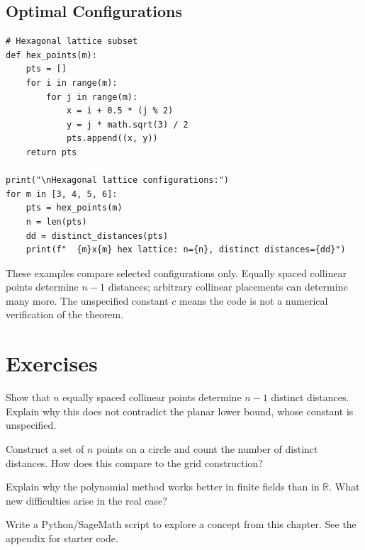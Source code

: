 \subsection{Optimal Configurations}

\begin{verbatim}
# Hexagonal lattice subset
def hex_points(m):
    pts = []
    for i in range(m):
        for j in range(m):
            x = i + 0.5 * (j % 2)
            y = j * math.sqrt(3) / 2
            pts.append((x, y))
    return pts

print("\nHexagonal lattice configurations:")
for m in [3, 4, 5, 6]:
    pts = hex_points(m)
    n = len(pts)
    dd = distinct_distances(pts)
    print(f"  {m}x{m} hex lattice: n={n}, distinct distances={dd}")
\end{verbatim}

\begin{highlightbox}
These examples compare selected configurations only. Equally spaced collinear points determine $n-1$ distances; arbitrary collinear placements can determine many more. The unspecified constant $c$ means the code is not a numerical verification of the theorem.
\end{highlightbox}

\section{Exercises}

\begin{exercise}[Basic]
Show that $n$ equally spaced collinear points determine $n-1$ distinct distances. Explain why this does not contradict the planar lower bound, whose constant is unspecified.
\end{exercise}

\begin{exercise}[Intermediate]
Construct a set of $n$ points on a circle and count the number of distinct distances. How does this compare to the grid construction?
\end{exercise}

\begin{exercise}[Challenge]
Explain why the polynomial method works better in finite fields than in $\mathbb{R}$. What new difficulties arise in the real case?
\end{exercise}


\begin{exercise}[Computational]
Write a Python/SageMath script to explore a concept from this chapter. See the appendix for starter code.
\end{exercise}

